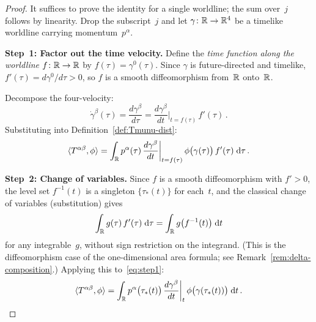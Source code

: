 \begin{proof}
  It suffices to prove the identity for a single worldline; the
  sum over~$j$ follows by linearity.  Drop the subscript~$j$ and
  let $\gamma\colon \mathbb{R} \to \mathbb{R}^{4}$ be a timelike worldline
  carrying momentum~$p^\alpha$.

  \medskip\noindent
  \textbf{Step~1: Factor out the time velocity.}\;
  Define the \emph{time function along the worldline}
  $f\colon \mathbb{R} \to \mathbb{R}$ by $f(\tau) = \gamma^0(\tau)$.
  Since $\gamma$ is future-directed and timelike,
  $f'(\tau) = d\gamma^0/d\tau > 0$, so $f$ is a smooth
  diffeomorphism from~$\mathbb{R}$ onto~$\mathbb{R}$.

  Decompose the four-velocity:
  \[
    \dot\gamma^\beta(\tau)
      = \frac{d\gamma^\beta}{d\tau}
      = \frac{d\gamma^\beta}{dt}\bigg|_{t=f(\tau)}\,f'(\tau)\,.
  \]
  Substituting into Definition~\ref{def:Tmunu-dist}:
  \begin{equation}\label{eq:step1}
    \langle T^{\alpha\beta},\phi\rangle
      = \int_{\mathbb{R}} p^\alpha(\tau)\,
        \frac{d\gamma^\beta}{dt}\bigg|_{t=f(\tau)}\,
        \phi\bigl(\gamma(\tau)\bigr)\,f'(\tau)\;\mathrm{d}\tau\,.
  \end{equation}

  \medskip\noindent
  \textbf{Step~2: Change of variables.}\;
  Since $f$ is a smooth diffeomorphism with $f' > 0$, the level
  set $f^{-1}(t)$ is a singleton $\{\tau_\ast(t)\}$ for each~$t$,
  and the classical change of variables (substitution) gives
  \[
    \int_{\mathbb{R}} g(\tau)\,f'(\tau)\;\mathrm{d}\tau
      = \int_{\mathbb{R}} g\bigl(f^{-1}(t)\bigr)\;\mathrm{d} t
  \]
  for any integrable~$g$, without sign restriction on the
  integrand.  (This is the diffeomorphism case of the
  one-dimensional area formula; see
  Remark~\ref{rem:delta-composition}.)  Applying this
  to~\eqref{eq:step1}:
  \begin{equation}\label{eq:step2}
    \langle T^{\alpha\beta},\phi\rangle
      = \int_{\mathbb{R}} p^\alpha\bigl(\tau_\ast(t)\bigr)\,
        \frac{d\gamma^\beta}{dt}\bigg|_{t}\,
        \phi\bigl(\gamma(\tau_\ast(t))\bigr)\;\mathrm{d} t\,.
  \end{equation}


\end{proof}
